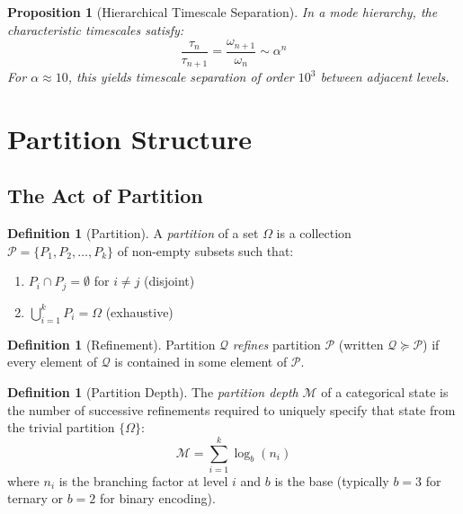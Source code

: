 \documentclass[twocolumn,10pt,a4paper]{article}
\newtheorem{proposition}[theorem]{Proposition}
\theoremstyle{definition}
\newtheorem{definition}[theorem]{Definition}
\theoremstyle{remark}
\newcommand{\Partition}{\mathcal{P}}
\newcommand{\Depth}{\mathcal{M}}
\begin{document}
\begin{proposition}[Hierarchical Timescale Separation]
\label{prop:timescale}
In a mode hierarchy, the characteristic timescales satisfy:
\begin{equation}
    \frac{\tau_n}{\tau_{n+1}} = \frac{\omega_{n+1}}{\omega_n} \sim \alpha^n
\end{equation}
For $\alpha \approx 10$, this yields timescale separation of order $10^3$ between adjacent levels.
\end{proposition}

\section{Partition Structure}
\label{sec:partition}

\subsection{The Act of Partition}

\begin{definition}[Partition]
\label{def:partition}
A \emph{partition} of a set $\Omega$ is a collection $\Partition = \{P_1, P_2, \ldots, P_k\}$ of non-empty subsets such that:
\begin{enumerate}
    \item $P_i \cap P_j = \emptyset$ for $i \neq j$ (disjoint)
    \item $\bigcup_{i=1}^{k} P_i = \Omega$ (exhaustive)
\end{enumerate}
\end{definition}

\begin{definition}[Refinement]
\label{def:refinement}
Partition $\mathcal{Q}$ \emph{refines} partition $\Partition$ (written $\mathcal{Q} \succeq \Partition$) if every element of $\mathcal{Q}$ is contained in some element of $\Partition$.
\end{definition}

\begin{definition}[Partition Depth]
\label{def:depth}
The \emph{partition depth} $\Depth$ of a categorical state is the number of successive refinements required to uniquely specify that state from the trivial partition $\{\Omega\}$:
\begin{equation}
    \Depth = \sum_{i=1}^{k} \log_b(n_i)
\end{equation}
where $n_i$ is the branching factor at level $i$ and $b$ is the base (typically $b = 3$ for ternary or $b = 2$ for binary encoding).
\end{definition}
\end{document}
